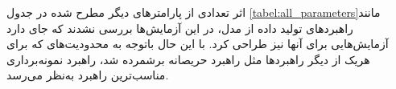 اثر تعدادی از پارامترهای دیگر مطرح شده در جدول \ref{tabel:all_parameters}مانند راهبردهای تولید داده از مدل، در این آزمایش‌ها بررسی نشدند که جای دارد آزمایش‌هایی برای آنها نیز طراحی کرد. با این حال باتوجه به محدودیت‌های که برای هریک از دیگر راهبردها مثل راهبرد حریصانه برشمرده شد، راهبرد نمونه‌برداری مناسب‌ترین راهبرد به‌نظر می‌رسد. 









